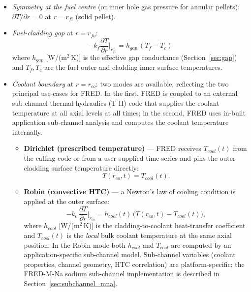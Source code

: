 \begin{refsection}
\begin{itemize}
\item \emph{Symmetry at the fuel centre} (or inner hole gas pressure for annular pellets): $\partial T/\partial r = 0$ at $r = r_{fi}$ (solid pellet).
\item \emph{Fuel-cladding gap} at $r = r_{fo}$:
        \begin{equation}
          -k_f \frac{\partial T}{\partial r}\bigg|_{r_{fo}^-}
          = h_{gap}\,(T_f - T_c)
          \label{eq:gap_bc}
        \end{equation}
where $h_{gap}$ [W/(m$^2$\,K)] is the effective gap conductance (Section~\ref{sec:gap}) and $T_f, T_c$ are the fuel outer and cladding inner surface temperatures.
\item \emph{Coolant boundary} at $r = r_{co}$: two modes are available, reflecting the two principal use-cases for FRED.  In the first, FRED is coupled to an external sub-channel thermal-hydraulics (T-H) code that supplies the coolant temperature at all axial levels at all times; in the second, FRED uses in-built application sub-channel analysis and computes the coolant temperature internally.
        \begin{itemize}
\item \textbf{Dirichlet (prescribed temperature)} — FRED receives $T_{cool}(t)$ from the calling code or from a user-supplied time series and pins the outer cladding surface temperature directly:
                \begin{equation}
                  T\!\left(r_{co},t\right) = T_{cool}(t).
                  \label{eq:dirichlet_bc}
                \end{equation}
\item \textbf{Robin (convective HTC)} — a Newton's law of cooling condition is applied at the outer surface:
                \begin{equation}
                  -k_c\,\frac{\partial T}{\partial r}\bigg|_{r_{co}}
                  = h_{cool}(t)\,\bigl(T(r_{co},t) - T_{cool}(t)\bigr),
                  \label{eq:robin_bc}
                \end{equation}
where $h_{cool}$ [W/(m$^2$\,K)] is the cladding-to-coolant heat-transfer coefficient and $T_{cool}(t)$ is the \emph{local} bulk coolant temperature at the same axial position.  In the Robin mode both $h_{cool}$ and $T_{cool}$ are computed by an application-specific sub-channel model. Sub-channel variables (coolant properties, channel geometry, HTC correlation) are platform-specific; the FRED-M-Na sodium sub-channel implementation is described in Section~\ref{sec:subchannel_mna}.
        \end{itemize}
\end{itemize}


\end{refsection}
